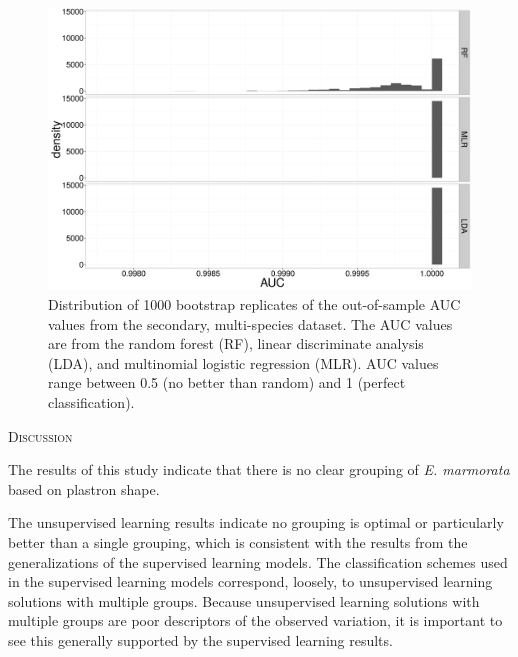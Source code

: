 \documentclass[12pt,letterpaper]{article}
\renewcommand{\section}[1]{%
\bigskip
\begin{center}
\begin{Large}
\normalfont\scshape #1
\medskip
\end{Large}
\end{center}}
\begin{document}
\begin{figure}[ht]
  \centering
  \includegraphics[height = 0.5\textheight, width = \textwidth, keepaspectratio = true]{figure/seven_boot}
  \caption{Distribution of 1000 bootstrap replicates of the out-of-sample AUC values from the secondary, multi-species dataset. The AUC values are from the random forest (RF), linear discriminate analysis (LDA), and multinomial logistic regression (MLR). AUC values range between 0.5 (no better than random) and 1 (perfect classification).}
  \label{fig:seven_boot}
\end{figure}


\section{Discussion}

The results of this study indicate that there is no clear grouping of \textit{E. marmorata} based on plastron shape.

The unsupervised learning results indicate no grouping is optimal or particularly better than a single grouping, which is consistent with the results from the generalizations of the supervised learning models. The classification schemes used in the supervised learning models correspond, loosely, to unsupervised learning solutions with multiple groups. Because unsupervised learning solutions with multiple groups are poor descriptors of the observed variation, it is important to see this generally supported by the supervised learning results.
\end{document}
